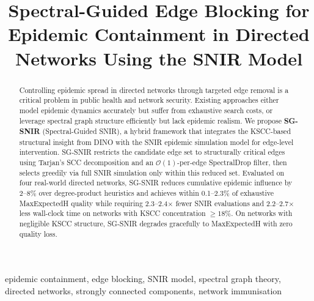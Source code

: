\documentclass[conference]{IEEEtran}
\begin{document}
\title{Spectral-Guided Edge Blocking for Epidemic Containment in Directed Networks Using the SNIR Model\\

}

\author{
\and
{}
\and
{}
}

\maketitle

\begin{abstract}
Controlling epidemic spread in directed networks through targeted edge removal is a critical problem in public health and network security. Existing approaches either model epidemic dynamics accurately but suffer from exhaustive search costs, or leverage spectral graph structure efficiently but lack epidemic realism. We propose \textbf{SG-SNIR} (Spectral-Guided SNIR), a hybrid framework that integrates the KSCC-based structural insight from DINO with the SNIR epidemic simulation model for edge-level intervention. SG-SNIR restricts the candidate edge set to structurally critical edges using Tarjan's SCC decomposition and an $\mathcal{O}(1)$-per-edge SpectralDrop filter, then selects greedily via full SNIR simulation only within this reduced set. Evaluated on four real-world directed networks, SG-SNIR reduces cumulative epidemic influence by 2--8\% over degree-product heuristics and achieves within 0.1--2.3\% of exhaustive MaxExpectedH quality while requiring 2.3--2.4$\times$ fewer SNIR evaluations and 2.2--2.7$\times$ less wall-clock time on networks with KSCC concentration $\geq 18\%$. On networks with negligible KSCC structure, SG-SNIR degrades gracefully to MaxExpectedH with zero quality loss.
\end{abstract}

\begin{IEEEkeywords}
epidemic containment, edge blocking, SNIR model, spectral graph theory, directed networks, strongly connected components, network immunisation
\end{IEEEkeywords}
\end{document}
